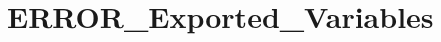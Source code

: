 \hypertarget{group___e_r_r_o_r___exported___variables}{}\section{E\+R\+R\+O\+R\+\_\+\+Exported\+\_\+\+Variables}
\label{group___e_r_r_o_r___exported___variables}

